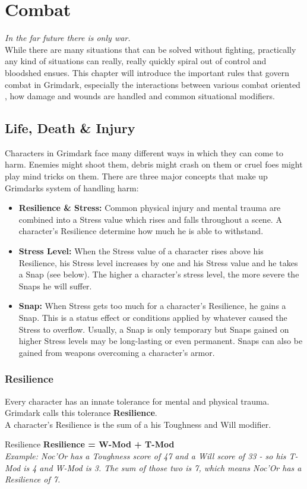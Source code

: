 \chapter{Combat} \label{combat_chapter}
\textit{In the far future there is only war.}\\
While there are many situations that can be solved without fighting, practically any kind of situations can really, really quickly spiral out of control and bloodshed ensues. 
This chapter will introduce the important rules that govern combat in Grimdark, especially the interactions between various combat oriented , how damage and wounds are handled and common situational modifiers.

\section{Life, Death \& Injury}
	Characters in Grimdark face many different ways in which they can come to harm.
	Enemies might shoot them, debris might crash on them or cruel foes might play mind tricks on them.
	There are three major concepts that make up Grimdarks system of handling harm:
	\begin{itemize}
		\item \textbf{Resilience \& Stress:} Common physical injury and mental trauma are combined into a Stress value which rises and falls throughout a scene. A character's Resilience determine how much he is able to withstand.
		\item \textbf{Stress Level:} When the Stress value of a character rises above his Resilience, his Stress level increases by one and his Stress value and he takes a Snap (see below). The higher a character's stress level, the more severe the Snaps he will suffer.
		\item \textbf{Snap:} When Stress gets too much for a character's Resilience, he gains a Snap. This is a status effect or conditions applied by whatever caused the Stress to overflow. Usually, a Snap is only temporary but Snaps gained on higher Stress levels may be long-lasting or even permanent. Snaps can also be gained from weapons overcoming a character's armor.
	\end{itemize}

\subsection{Resilience}\label{Resilience}
	Every character has an innate tolerance for mental and physical trauma.
	Grimdark calls this tolerance \textbf{Resilience}.\\
	A character's Resilience is the sum of a his Toughness and Will modifier.
	\begin{DndComment}{Resilience}
		\textbf{Resilience = W-Mod + T-Mod}\\
		\textit{Example: Noc'Or has a Toughness score of 47 and a Will score of 33 - so his T-Mod is 4 and W-Mod is 3. The sum of those two is 7, which means Noc'Or has a Resilience of 7.}
	\end{DndComment}

